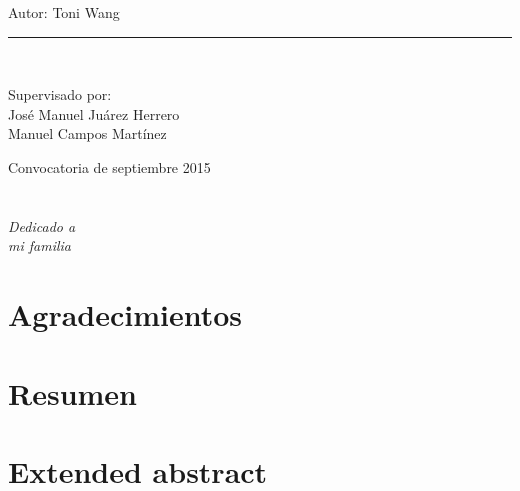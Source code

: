 \documentclass[a4paper,openright,12pt]{book}
\begin{document}
\begin{titlepage}
\begin{center}
		\vspace*{0.3in}
		\begin{large}
			Autor: Toni Wang\\
		\end{large}
		\vspace*{0.2in}
		\rule{80mm}{0.1mm}\\
		\vspace*{0.2in}
		\begin{large}
			Supervisado por: \\
			José Manuel Juárez Herrero \\
			Manuel Campos Martínez \\
		\end{large}
		\vspace*{0.9in}
		Convocatoria de septiembre 2015
	\end{center}
	\vspace*{\fill}
\end{titlepage}



\chapter*{}
\lhead[\thepage]{}
\rhead[]{}

\begin{flushright}
\textit{Dedicado a \\
mi familia}
\end{flushright}

\chapter*{Agradecimientos} %
 
\chapter*{Resumen} %

\chapter*{Extended abstract} %
\end{document}
